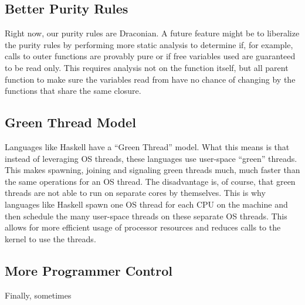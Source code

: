 \documentclass{acm_proc_article-sp}
\begin{document}
\subsection*{Better Purity Rules}
Right now, our purity rules are Draconian. A future feature might be to liberalize
the purity rules by performing more static analysis to determine if, for example, 
calls to outer functions are provably pure or if free variables used are guaranteed
to be read only. This requires analysis not on the function itself, but all parent
function to make sure the variables read from have no chance of changing by the
functions that share the same closure.

\subsection*{Green Thread Model}

Languages like Haskell have a ``Green Thread'' model. What this means
is that instead of leveraging OS threads, these languages use user-space
``green'' threads. This makes spawning, joining and signaling green threads
much, much faster than the same operations for an OS thread. The disadvantage
is, of course, that green threads are not able to run on separate cores by
themselves. This is why languages like Haskell spawn one OS thread for each
CPU on the machine and then schedule the many user-space threads on these
separate OS threads. This allows for more efficient usage of processor resources
and reduces calls to the kernel to use the threads.

\subsection{More Programmer Control}

Finally, sometimes
\end{document}
